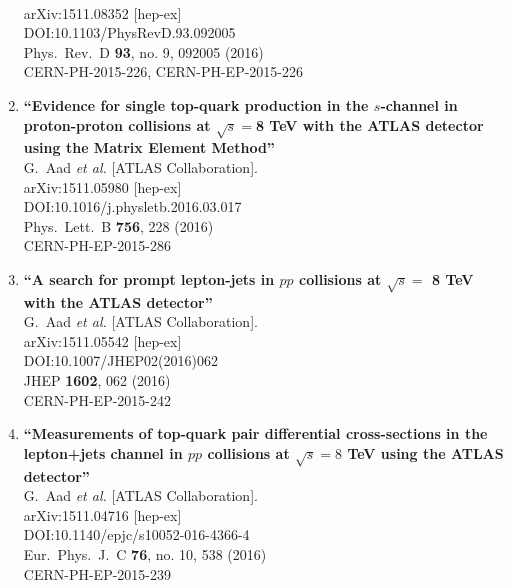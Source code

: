 \documentclass{article}
\begin{document}
\begin{enumerate}
  \\{}arXiv:1511.08352 [hep-ex]
  \\{}DOI:10.1103/PhysRevD.93.092005
  \\{}Phys.\ Rev.\ D {\bf 93}, no. 9, 092005 (2016)
  \\{}CERN-PH-2015-226, CERN-PH-EP-2015-226
\item%
{\bf ``Evidence for single top-quark production in the $s$-channel in proton-proton collisions at $\sqrt{s}=$8 TeV with the ATLAS detector using the Matrix Element Method''}
  \\{}G.~Aad {\it et al.} [ATLAS Collaboration].
  \\{}arXiv:1511.05980 [hep-ex]
  \\{}DOI:10.1016/j.physletb.2016.03.017
  \\{}Phys.\ Lett.\ B {\bf 756}, 228 (2016)
  \\{}CERN-PH-EP-2015-286
\item%
{\bf ``A search for prompt lepton-jets in $pp$ collisions at $\sqrt{s}=$ 8 TeV with the ATLAS detector''}
  \\{}G.~Aad {\it et al.} [ATLAS Collaboration].
  \\{}arXiv:1511.05542 [hep-ex]
  \\{}DOI:10.1007/JHEP02(2016)062
  \\{}JHEP {\bf 1602}, 062 (2016)
  \\{}CERN-PH-EP-2015-242
\item%
{\bf ``Measurements of top-quark pair differential cross-sections in the lepton+jets channel in $pp$ collisions at $\sqrt{s}=8$ TeV using the ATLAS detector''}
  \\{}G.~Aad {\it et al.} [ATLAS Collaboration].
  \\{}arXiv:1511.04716 [hep-ex]
  \\{}DOI:10.1140/epjc/s10052-016-4366-4
  \\{}Eur.\ Phys.\ J.\ C {\bf 76}, no. 10, 538 (2016)
  \\{}CERN-PH-EP-2015-239

\end{enumerate}
\end{document}
